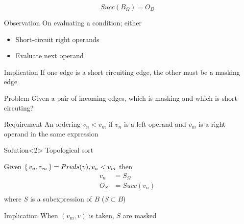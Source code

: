 \documentclass[xcolor = {dvipsnames, table}]{beamer}
\begin{document}
\begin{frame}
    \begin{equation*}
        Succ(B_\Omega) = O_B
    \end{equation*}

    \begin{block}{Observation}
        On evaluating a condition; either
        \begin{itemize}
            \item Short-circuit right operands
            \item Evaluate next operand
        \end{itemize}
    \end{block}

    \begin{block}{Implication}
        If one edge is a short circuiting edge, the other must be a masking
        edge
    \end{block}
\end{frame}

\begin{frame}
    \begin{block}{Problem}
        Given a pair of incoming edges, which is masking and which is short
        circuting?
    \end{block}

    \begin{block}{Requirement}
        An ordering $v_n < v_m$ if $v_n$ is a left operand and $v_m$ is
        a right operand in the same expression
    \end{block}

    \begin{block}{Solution}<2>
        Topological sort
    \end{block}
\end{frame}

\begin{frame}
    Given $\set{v_n, v_m} = Preds(v), v_n < v_m$ then
    \begin{align*}
        v_n &= S_\Omega \\
        O_S &= Succ(v_n) \\
    \end{align*}
    where $S$ is a subexpression of $B$ ($S \subset B$)

    \begin{block}{Implication}
        When $(v_m, v)$ is taken, $S$ are masked
    \end{block}
\end{frame}
\end{document}
